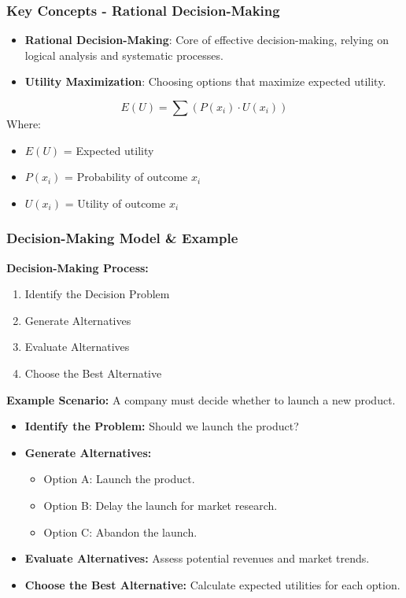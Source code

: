 \documentclass[aspectratio=169]{beamer}
\begin{document}
\begin{frame}[fragile]
    \frametitle{Key Concepts - Rational Decision-Making}
    \begin{itemize}
        \item \textbf{Rational Decision-Making}: Core of effective decision-making, relying on logical analysis and systematic processes.
        \item \textbf{Utility Maximization}: Choosing options that maximize expected utility.
    \end{itemize}
    \begin{equation}
        E(U) = \sum (P(x_i) \cdot U(x_i))
    \end{equation}
    Where:
    \begin{itemize}
        \item \( E(U) \) = Expected utility
        \item \( P(x_i) \) = Probability of outcome \( x_i \)
        \item \( U(x_i) \) = Utility of outcome \( x_i \)
    \end{itemize}
\end{frame}

\begin{frame}[fragile]
    \frametitle{Decision-Making Model & Example}
    \textbf{Decision-Making Process:}
    \begin{enumerate}
        \item Identify the Decision Problem
        \item Generate Alternatives
        \item Evaluate Alternatives
        \item Choose the Best Alternative
    \end{enumerate}

    \textbf{Example Scenario:} A company must decide whether to launch a new product.
    \begin{itemize}
        \item \textbf{Identify the Problem:} Should we launch the product?
        \item \textbf{Generate Alternatives:}
        \begin{itemize}
            \item Option A: Launch the product.
            \item Option B: Delay the launch for market research.
            \item Option C: Abandon the launch.
        \end{itemize}
        \item \textbf{Evaluate Alternatives:} Assess potential revenues and market trends.
        \item \textbf{Choose the Best Alternative:} Calculate expected utilities for each option.
    \end{itemize}
\end{frame}
\end{document}
